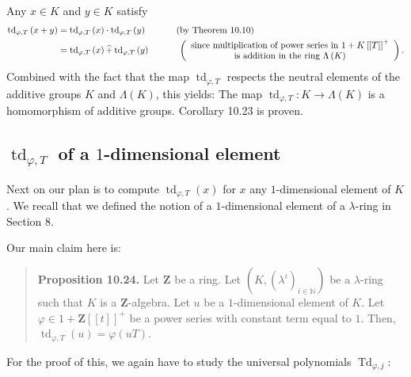 \documentclass[numbers=enddot,12pt,final,onecolumn,notitlepage]{scrartcl}%
\begin{document}
Any $x\in K$ and $y\in K$ satisfy%
\begin{align*}
\operatorname*{td}\nolimits_{\varphi,T}\left(  x+y\right)   &
=\operatorname*{td}\nolimits_{\varphi,T}\left(  x\right)  \cdot
\operatorname*{td}\nolimits_{\varphi,T}\left(  y\right)
\ \ \ \ \ \ \ \ \ \ \left(  \text{by Theorem 10.10}\right) \\
&  =\operatorname*{td}\nolimits_{\varphi,T}\left(  x\right)  \widehat{+}%
\operatorname*{td}\nolimits_{\varphi,T}\left(  y\right)
\ \ \ \ \ \ \ \ \ \ \left(
\begin{array}
[c]{c}%
\text{since multiplication of power series in }1+K\left[  \left[  T\right]
\right]  ^{+}\\
\text{is addition in the ring }\Lambda\left(  K\right)
\end{array}
\right)  .
\end{align*}
Combined with the fact that the map $\operatorname*{td}\nolimits_{\varphi,T}$
respects the neutral elements of the additive groups $K$ and $\Lambda\left(
K\right)  $, this yields: The map $\operatorname*{td}_{\varphi,T}%
:K\rightarrow\Lambda\left(  K\right)  $ is a homomorphism of additive groups.
Corollary 10.23 is proven.

\subsection{ $\operatorname*{td}_{\varphi,T}$ of a $1$-dimensional element}

Next on our plan is to compute $\operatorname*{td}\nolimits_{\varphi,T}\left(
x\right)  $ for $x$ any $1$-dimensional element of $K$. We recall that we
defined the notion of a $1$-dimensional element of a $\lambda$-ring in Section 8.

Our main claim here is:

\begin{quote}
\textbf{Proposition 10.24.} Let $\mathbf{Z}$ be a ring. Let $\left(  K,\left(
\lambda^{i}\right)  _{i\in\mathbb{N}}\right)  $ be a $\lambda$-ring such that
$K$ is a $\mathbf{Z}$-algebra. Let $u$ be a $1$-dimensional element of $K$.
Let $\varphi\in1+\mathbf{Z}\left[  \left[  t\right]  \right]  ^{+}$ be a power
series with constant term equal to $1$. Then, $\operatorname*{td}%
\nolimits_{\varphi,T}\left(  u\right)  =\varphi\left(  uT\right)  $.
\end{quote}

For the proof of this, we again have to study the universal polynomials
$\operatorname*{Td}\nolimits_{\varphi,j}$:
\end{document}
